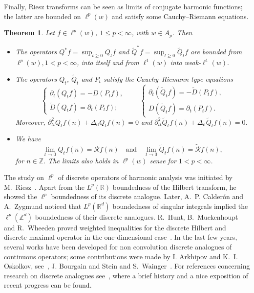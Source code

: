\documentclass[11pt]{amsart}
\numberwithin{equation}{section}
\newcommand{\Z}{\mathbb{Z}}
\newcommand{\R}{\mathbb{R}}
\newcommand{\dis}{\mathrm{d}}
\theoremstyle{plain}
\newtheorem{thm}{Theorem}
\theoremstyle{remark}
\begin{document}
Finally, Riesz transforms can be seen as limits of conjugate harmonic functions; the latter are bounded on $\ell^p(w)$ and satisfy some Cauchy--Riemann equations.

\begin{thm}
\label{thm:Cauchy}
Let $f\in\ell^p(w)$, $1\le p < \infty$, with $w\in A_p$. Then
\begin{itemize}
\item[(i)] The operators $ Q^*f = \sup_{t\ge0} Q_t f$ and $ \widetilde{Q}^* f= \sup_{t\ge0}\widetilde{Q}_t f$ are bounded
from $\ell^p(w), 1<p< \infty$, into itself and from $\ell^1(w)$ into weak-$\ell^1(w).$
\item[(ii)] The operators $Q_t$, $\widetilde{Q}_t$ and $P_t$ satisfy the Cauchy--Riemann type equations
\[
\begin{cases}
\partial_t(Q_tf) = -D(P_tf), \\
 \widetilde{D}(Q_tf) = \partial_t(P_tf);
\end{cases}
\quad \quad\begin{cases}
\partial_t(\widetilde{Q}_tf)
= -\widetilde{D}(P_tf),\\
 D(\widetilde{Q}_tf) = \partial_t(P_tf).
\end{cases}
\]
Moreover, $\partial^2_{tt} Q_tf(n) + \Delta_{\dis} Q_tf(n) =0$
and $\partial^2_{tt} \widetilde{Q}_tf(n)  + \Delta_{\dis} \widetilde{Q}_tf(n) =0$.
\item[(iii)] We have
\[
\lim_{t\to 0} Q_tf(n) = \mathcal{R} f(n) \quad \text{and}\quad \lim_{t\to 0} \widetilde{Q}_tf(n) = \widetilde{\mathcal{R}} f(n),
\]
for $n \in \mathbb{Z}$.
The limits also holds in $\ell^p(w)$ sense for $1<p<\infty$.
\end{itemize}
\end{thm}


The study on $\ell^p$ of discrete operators of harmonic analysis was initiated by M.~Riesz~\cite{Riesz}. Apart from the $L^p(\R)$ boundedness of the Hilbert transform, he showed the $\ell^p$ boundedness of its discrete analogue. Later, A.~P. Calder\'on and A.~Zygmund \cite{Calderon-Zygmund} noticed that $L^p(\R^d)$ boundedness of singular integrals implied the $\ell^p(\Z^d)$ boundedness of their discrete analogues. R.~Hunt, B.~Muckenhoupt and R.~Wheeden proved weighted inequalities for the discrete Hilbert and discrete maximal operator in the one-dimensional case~\cite{HuMuWh}.
In the last few years, several works have been developed for non convolution discrete analogues of continuous operators; some contributions were made by I. Arkhipov and K.~I. Oskolkov, see~\cite{ArOs},
J. Bourgain \cite{Bourgain4} and Stein and S.~Wainger~\cite{StWa1,StWa2}.
For references concerning research on discrete analogues see~\cite{Pierce-tesis}, where a brief history and a nice exposition of recent progress can be found.
\end{document}
